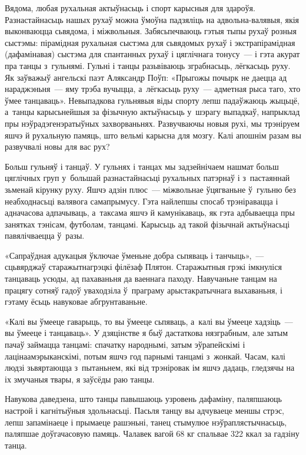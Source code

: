 Вядома, любая рухальная актыўнасьць і спорт карысныя для здароўя. Разнастайнасьць нашых рухаў можна ўмоўна падзяліць на адвольна-валявыя, якія выконваюцца сьвядома, і міжвольныя. Забясьпечваюць гэтыя тыпы рухаў розныя сыстэмы: пірамідная рухальная сыстэма для сьвядомых рухаў і экстрапірамідная (дафамінавая) сыстэма для спантанных рухаў і цяглічнага тонусу~--- і гэта акурат пра танцы з~гульнямі. Гульні і танцы разьвіваюць зграбнасьць, лёгкасьць руху. Як заўважыў ангельскі паэт Аляксандр Поўп: «Прыгожы почырк не даецца ад нараджэньня~--- яму трэба вучыцца, а~лёгкасьць руху~--- адметная рыса таго, хто ўмее танцаваць». Невыпадкова гульнявыя віды спорту лепш падаўжаюць жыцьцё, а~танцы карысьнейшыя за фізычную актыўнасьць у~шэрагу выпадкаў, напрыклад пры нэўрадэгенэратыўных захворваньнях. Развучваючы новыя рухі, мы трэніруем яшчэ й рухальную памяць, што вельмі карысна для мозгу. Калі апошнім разам вы развучвалі новы для вас рух?

Больш гульняў і танцаў. У гульнях і танцах мы задзейнічаем нашмат больш цяглічных груп у~большай разнастайнасьці рухальных патэрнаў і з~пастаяннай зьменай кірунку руху. Яшчэ адзін плюс~--- міжвольнае ўцягваньне ў~гульню без неабходнасьці валявога самапрымусу. Гэта найлепшы спосаб трэніравацца і адначасова адпачываць, а~таксама яшчэ й камунікаваць, як гэта адбываецца пры занятках тэнісам, футболам, танцамі. Карысьць ад такой фізычнай актыўнасьці павялічваецца ў~разы.

«Сапраўдная адукацыя ўключае ўменьне добра сьпяваць і танчыць»,~--- сцьвярджаў старажытнагрэцкі філёзаф Плятон. Старажытныя грэкі імкнуліся танцаваць усюды, ад пахаваньня да ваеннага паходу. Навучаньне танцам на працягу сотняў гадоў уваходзіла ў~праграму арыстакратычнага выхаваньня, і гэтаму ёсьць навуковае абгрунтаваньне.

«Калі вы ўмееце гаварыць, то вы ўмееце сьпяваць, а~калі вы ўмееце хадзіць~--- вы ўмееце і танцаваць». У дзяцінстве я быў дастаткова нязграбным, але затым пачаў займацца танцамі: спачатку народнымі, затым эўрапейскімі і лацінаамэрыканскімі, потым яшчэ год парнымі танцамі з~жонкай. Часам, калі людзі зьвяртаюцца з~пытаньнем, які від трэніровак ім яшчэ дадаць, гледзячы на іх змучаныя твары, я заўсёды раю танцы.

Навукова даведзена, што танцы павышаюць узровень дафаміну, паляпшаюць настрой і кагнітыўныя здольнасьці. Пасьля танцу вы адчуваеце меншы стрэс, лепш запамінаеце і прымаеце рашэньні, танец стымулюе нэўраплястычнасьць, паляпшае доўгачасовую памяць. Чалавек вагой 68 кг спальвае 322 ккал за гадзіну танца.

